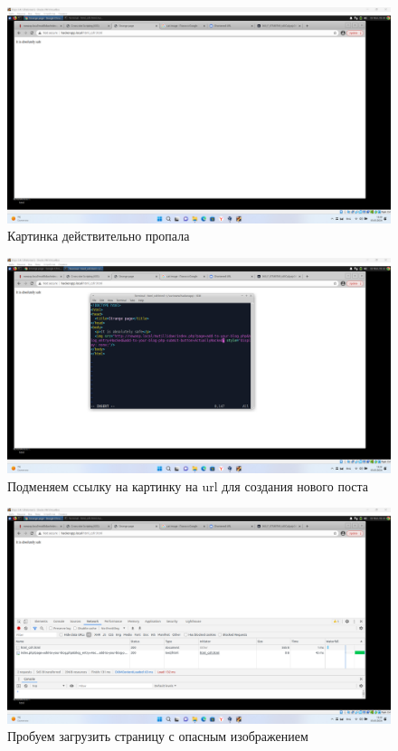 \documentclass[a4paper]{article}
\begin{document}
  \begin{figure}[H]
    \centering
    \includegraphics[width=\textwidth]{Screenshot_40}
    \caption{Картинка действительно пропала}
  \end{figure}

  \begin{figure}[H]
    \centering
    \includegraphics[width=\textwidth]{Screenshot_41}
    \caption{Подменяем ссылку на картинку на url для создания нового поста}
  \end{figure}

  \begin{figure}[H]
    \centering
    \includegraphics[width=\textwidth]{Screenshot_42}
    \caption{Пробуем загрузить страницу с опасным изображением}
  \end{figure}
\end{document}

